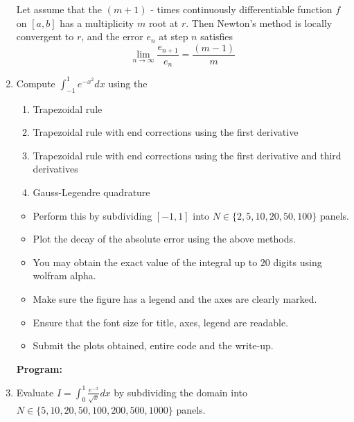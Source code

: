 \documentclass[a4paper,11pt]{report}
\begin{document}
\begin{enumerate}
    
    Let assume that the $(m+1)$ - times continuously differentiable function
    $f$ on $[a, b]$ has a multiplicity $m$ root at $r$. Then Newton's method is 
    locally convergent to $r$, and the error $e_{n}$ at step $n$ satisfies
    \begin{equation*}
    \lim_{n \rightarrow \infty} \frac{e_{n+1}}{e_{n}} = \frac{(m-1)}{m}
    \end{equation*}








    \item Compute $\displaystyle \int_{-1}^{1} e^{-x^{2}} dx$ using the

    \begin{enumerate}
    \item Trapezoidal rule
    \item Trapezoidal rule with end corrections using the first derivative
    \item Trapezoidal rule with end corrections using the first derivative and third
    derivatives
    \item Gauss-Legendre quadrature
    \end{enumerate}

    \begin{itemize}
    \item Perform this by subdividing $[-1, 1]$ into $N \in \{2, 5, 10, 20, 50, 100\}$ 
    panels.
    \item Plot the decay of the absolute error using the above methods.
    \item You may obtain the exact value of the integral up to $20$ digits using
    wolfram alpha.
    \item Make sure the figure has a legend and the axes are clearly marked.
    \item Ensure that the font size for title, axes, legend are readable.
    \item Submit the plots obtained, entire code and the write-up.
    \end{itemize}
        
    \textbf{Program:}
    

    \begin{figure}[ht!]
    \centering
    \resizebox{0.9\linewidth}{!}{}
    \end{figure}

    \item Evaluate $I = \displaystyle \int_{0}^{1} \frac{e^{-x}}{\sqrt{x}} dx$ by
    subdividing the domain into $N \in \{5, 10, 20, 50, 100, 200, 500, 1000\}$ panels.


\end{enumerate}
\end{document}
